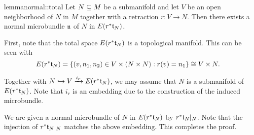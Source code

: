 \begin{mystatement}{lemma}{normal::total} Let $N \subseteq{} M$ be a submanifold and let $V$ be an open neighborhood of $N$ in $M$ together with a retraction $r: V \to N$. Then there exists a normal microbundle $\mathfrak{n}$ of $N$ in $E(r^*\mathfrak{t}_N)$.  \end{mystatement}

\begin{myproof} First, note that the total space $E(r^*\mathfrak{t}_N)$ is a topological manifold. This can be seen with \[ E(r^*\mathfrak{t}_N) = \{(v, n_1, n_2) \in V \times (N \times N):r(v) = n_1\} \cong V \times N. \]

Together with $N \hookrightarrow{} V \xrightarrow{i_r} E(r^*\mathfrak{t}_N)$, we may assume that $N$ is a submanifold of $E(r^*\mathfrak{t}_N)$. Note that $i_{r}$ is an embedding due to the construction of the induced microbundle.

We are given a normal microbundle of $N$ in $E(r^*\mathfrak{t}_N)$ by $r^*\mathfrak{t}_N\vert_{N}$. Note that the injection of $r^*\mathfrak{t}_N\vert_{N}$ matches the above embedding. This completes the proof. \end{myproof}